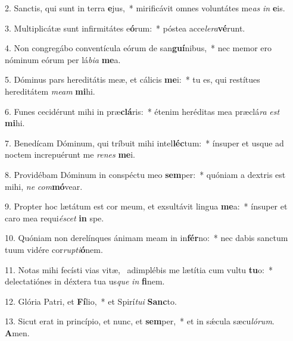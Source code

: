 2. Sanctis, qui sunt in terra \textbf{e}jus,~*  mirificávit omnes voluntátes me\textit{as} \textit{in} \textbf{e}is.\

3. Multiplicátæ sunt infirmitátes e\textbf{ó}rum:~*  póstea acce\textit{le}\textit{ra}\textbf{vé}runt.\

4. Non congregábo conventícula eórum de san\textbf{guí}nibus,~*  nec memor ero nóminum eórum per lá\textit{bi}\textit{a} \textbf{me}a.\

5. Dóminus pars hereditátis meæ, et cálicis \textbf{me}i:~*  tu es, qui restítues hereditátem \textit{me}\textit{am} \textbf{mi}hi.\

6. Funes cecidérunt mihi in præ\textbf{clá}ris:~*  étenim heréditas mea præclá\textit{ra} \textit{est} \textbf{mi}hi.\

7. Benedícam Dóminum, qui tríbuit mihi intel\textbf{léc}tum:~*  ínsuper et usque ad noctem increpuérunt me \textit{re}\textit{nes} \textbf{me}i.\

8. Providébam Dóminum in conspéctu meo \textbf{sem}per:~*  quóniam a dextris est mihi, \textit{ne} \textit{com}\textbf{mó}vear.\

9. Propter hoc lætátum est cor meum, et exsultávit lingua \textbf{me}a:~*  ínsuper et caro mea requi\textit{é}\textit{scet} \textbf{in} spe.\

10. Quóniam non derelínques ánimam meam in in\textbf{fér}no:~*  nec dabis sanctum tuum vidére cor\textit{rup}\textit{ti}\textbf{ó}nem.\

11. Notas mihi fecísti vias vitæ, \dag\  adimplébis me lætítia cum vultu \textbf{tu}o:~*  delectatiónes in déxtera tua us\textit{que} \textit{in} \textbf{fi}nem.\

12. Glória Patri, et \textbf{Fí}lio,~*  et Spirí\textit{tu}\textit{i} \textbf{Sanc}to.\

13. Sicut erat in princípio, et nunc, et \textbf{sem}per,~*  et in sǽcula sæcu\textit{ló}\textit{rum}. \textbf{A}men.\

